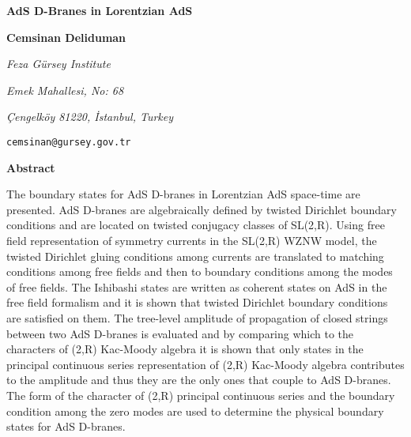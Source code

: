 \documentclass[a4paper,12pt]{article}
\begin{document}
\thispagestyle{empty} 

{\vskip2.0cm}

\begin{center}
{\Large \textbf{AdS\coordHE{} D-Branes in Lorentzian AdS\coordHE{}}}

{\vskip0.5cm}

\textbf{Cemsinan Deliduman}

{\vskip0.5cm}

\textit{Feza G\"{u}rsey Institute}

\textit{Emek Mahallesi, No: 68}

\textit{\c{C}engelk\"{o}y 81220, \.{I}stanbul, Turkey}

\texttt{cemsinan@gursey.gov.tr}

{\vskip1.0cm}

\textbf{Abstract}

{\vskip0.5cm}
\end{center}

The boundary states for AdS\coordHE{} D-branes in Lorentzian AdS\coordHE{}
space-time are presented. AdS\coordHE{} D-branes are algebraically defined by
twisted Dirichlet boundary conditions and are located on twisted conjugacy
classes of SL(2,R). Using free field representation of symmetry currents in
the SL(2,R) WZNW model, the twisted Dirichlet gluing conditions among
currents are translated to matching conditions among free fields and then to
boundary conditions among the modes of free fields. The Ishibashi states are
written as coherent states on AdS\coordHE{} in the free field formalism and it
is shown that twisted Dirichlet boundary conditions are satisfied on them.
The tree-level amplitude of propagation of closed strings between two AdS\coordHE{} D-branes is evaluated and by comparing which to the characters of \coordHE{}(2,R) Kac-Moody algebra it is shown that only states
in the principal continuous series representation of \coordHE{}%
(2,R) Kac-Moody algebra contributes to the amplitude and thus they are the
only ones that couple to AdS\coordHE{} D-branes. The form of the character of \coordHE{}(2,R) principal continuous series and the boundary
condition among the zero modes are used to determine the physical boundary
states for AdS\coordHE{} D-branes.
\end{document}
